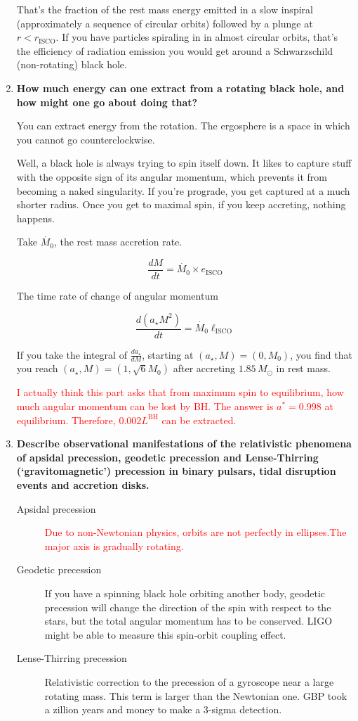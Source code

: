 \documentclass[a4paper]{article}
\begin{document}
\begin{enumerate}
That's the fraction of the rest mass energy emitted in a slow inspiral (approximately a sequence of circular orbits) followed by a plunge at $r < r_\mathrm{ISCO}$. 
If you have particles spiraling in in almost circular orbits, that's the efficiency of radiation emission you would get around a Schwarzschild (non-rotating) black hole. 

\item \textbf{How much energy can one extract from a rotating black hole, and how might one go about doing that?}

You can extract energy from the rotation. The ergosphere is a space in which you cannot go counterclockwise. 


Well, a black hole is always trying to spin itself down. It likes to capture stuff with the opposite sign of its angular momentum, which prevents it from becoming a naked singularity. If you're prograde, you get captured at a much shorter radius. Once you get to maximal spin, if you keep accreting, nothing happens. 

Take $\dot{M_0}$, the rest mass accretion rate. 

$$ \frac{dM}{dt} = \dot{M_0} \times e_\mathrm{ISCO}$$

The time rate of change of angular momentum 

$$ \frac{d (a_\star M^2)}{dt} =  \dot{M_0} \ell_\mathrm{ISCO}$$

If you take the integral of $ \frac{da_\star}{dM} $, starting at $(a_\star, M)=(0,M_0)$, you find that you reach $(a_\star, M)=(1,\sqrt{6}M_0)$ after accreting $1.85\,M_\odot$ in rest mass. 

\textcolor{red}{I actually think this part asks that from maximum spin to equilibrium, how much angular momentum can be lost by BH. The answer is $a^*=0.998$ at equilibrium. Therefore, $0.002 L^\mathrm{BH}$ can be extracted. }

\item \textbf{Describe observational manifestations of the relativistic phenomena of apsidal precession, geodetic precession and Lense-Thirring (‘gravitomagnetic’) precession in binary pulsars, tidal disruption events and accretion disks.}

\begin{description}
\item[Apsidal precession] \textcolor{red}{Due to non-Newtonian physics, orbits are not perfectly in ellipses.The major axis is gradually rotating. }
\item[Geodetic precession] If you have a spinning black hole orbiting another body, geodetic precession will change the direction of the spin with respect to the stars, but the total angular momentum has to be conserved. LIGO might be able to measure this spin-orbit coupling effect. 
\item[Lense-Thirring precession] Relativistic correction to the precession of a gyroscope near a large rotating mass. This term is larger than the Newtonian one. GBP took a zillion years and money to make a 3-sigma detection. 
\end{description}


\end{enumerate}
\end{document}
